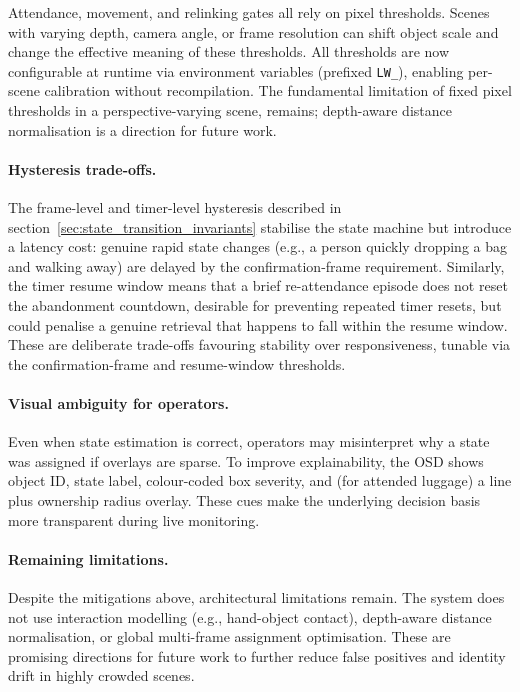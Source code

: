 Attendance, movement, and relinking gates all rely on pixel thresholds. Scenes
with varying depth, camera angle, or frame resolution can shift object scale
and change the effective meaning of these thresholds. All thresholds are now
configurable at runtime via environment variables (prefixed \texttt{LW\_}),
enabling per-scene calibration without recompilation. The fundamental
limitation of fixed pixel thresholds in a perspective-varying scene, remains;
depth-aware distance normalisation is a direction for future work.

\paragraph{Hysteresis trade-offs.}

The frame-level and timer-level hysteresis described in
section~\ref{sec:state_transition_invariants} stabilise the state machine but
introduce a latency cost: genuine rapid state changes (e.g., a person quickly
dropping a bag and walking away) are delayed by the confirmation-frame
requirement. Similarly, the timer resume window means that a brief
re-attendance episode does not reset the abandonment countdown, desirable for
preventing repeated timer resets, but could penalise a genuine retrieval that
happens to fall within the resume window. These are deliberate trade-offs
favouring stability over responsiveness, tunable via the confirmation-frame and
resume-window thresholds.

\paragraph{Visual ambiguity for operators.}

Even when state estimation is correct, operators may misinterpret why a state
was assigned if overlays are sparse. To improve explainability, the OSD shows
object ID, state label, colour-coded box severity, and (for attended luggage) a
line plus ownership radius overlay. These cues make the underlying decision
basis more transparent during live monitoring.

\paragraph{Remaining limitations.}

Despite the mitigations above, architectural limitations remain. The system
does not use interaction modelling (e.g., hand-object contact), depth-aware
distance normalisation, or global multi-frame assignment optimisation. These
are promising directions for future work to further reduce false positives and
identity drift in highly crowded scenes.